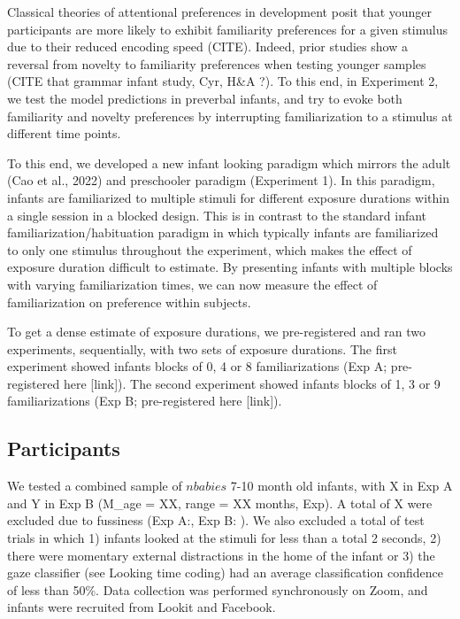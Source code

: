 \documentclass[10pt, letterpaper]{article}
\begin{document}
Classical theories of attentional preferences in development posit that
younger participants are more likely to exhibit familiarity preferences
for a given stimulus due to their reduced encoding speed (CITE). Indeed,
prior studies show a reversal from novelty to familiarity preferences
when testing younger samples (CITE that grammar infant study, Cyr, H\&A
?). To this end, in Experiment 2, we test the model predictions in
preverbal infants, and try to evoke both familiarity and novelty
preferences by interrupting familiarization to a stimulus at different
time points.

To this end, we developed a new infant looking paradigm which mirrors
the adult (Cao et al., 2022) and preschooler paradigm (Experiment 1). In
this paradigm, infants are familiarized to multiple stimuli for
different exposure durations within a single session in a blocked
design. This is in contrast to the standard infant
familiarization/habituation paradigm in which typically infants are
familiarized to only one stimulus throughout the experiment, which makes
the effect of exposure duration difficult to estimate. By presenting
infants with multiple blocks with varying familiarization times, we can
now measure the effect of familiarization on preference within subjects.

To get a dense estimate of exposure durations, we pre-registered and ran
two experiments, sequentially, with two sets of exposure durations. The
first experiment showed infants blocks of 0, 4 or 8 familiarizations
(Exp A; pre-registered here {[}link{]}). The second experiment showed
infants blocks of 1, 3 or 9 familiarizations (Exp B; pre-registered here
{[}link{]}).

\hypertarget{participants-1}{%
\subsection{Participants}\label{participants-1}}

We tested a combined sample of \(n babies\) 7-10 month old infants, with
X in Exp A and Y in Exp B (M\_age = XX, range = XX months, Exp). A total
of X were excluded due to fussiness (Exp A:, Exp B: ). We also excluded
a total of test trials in which 1) infants looked at the stimuli for
less than a total 2 seconds, 2) there were momentary external
distractions in the home of the infant or 3) the gaze classifier (see
Looking time coding) had an average classification confidence of less
than 50\%. Data collection was performed synchronously on Zoom, and
infants were recruited from Lookit and Facebook.
\end{document}
